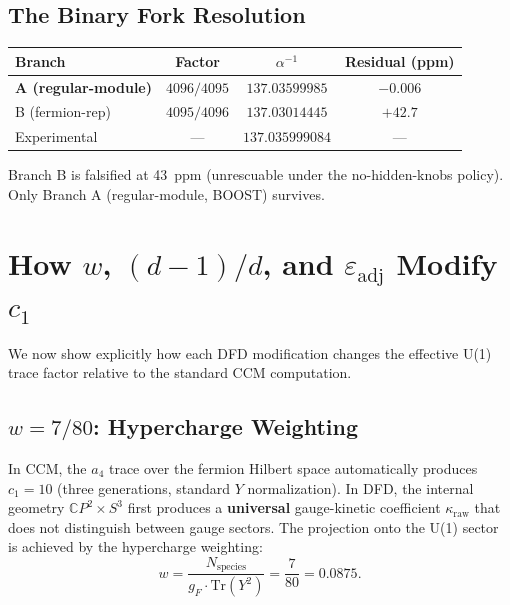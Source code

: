 \documentclass[12pt,a4paper]{article}
\begin{document}
\subsection{The Binary Fork Resolution}

\begin{center}
\renewcommand{\arraystretch}{1.3}
\begin{tabular}{lccc}
\toprule
\textbf{Branch} & \textbf{Factor} & $\alpha^{-1}$ & \textbf{Residual (ppm)} \\
\midrule
\textbf{A (regular-module)} & $4096/4095$ & $137.03599985$ & $-0.006$ \\
B (fermion-rep) & $4095/4096$ & $137.03014445$ & $+42.7$ \\
\midrule
Experimental & --- & $137.035999084$ & --- \\
\bottomrule
\end{tabular}
\end{center}

Branch B is falsified at 43~ppm (unrescuable under the no-hidden-knobs
policy).  Only Branch A (regular-module, BOOST) survives.

\section{How $w$, $(d-1)/d$, and $\varepsilon_{\mathrm{adj}}$ Modify $c_1$}
\label{sec:modifications}

We now show explicitly how each DFD modification changes the effective
U(1) trace factor relative to the standard CCM computation.

\subsection{$w = 7/80$: Hypercharge Weighting}

In CCM, the $a_4$ trace over the fermion Hilbert space automatically
produces $c_1 = 10$ (three generations, standard $Y$ normalization).
In DFD, the internal geometry $\mathbb{C}P^2 \times S^3$ first produces
a \textbf{universal} gauge-kinetic coefficient $\kappa_{\mathrm{raw}}$
that does not distinguish between gauge sectors.  The projection onto the
U(1) sector is achieved by the hypercharge weighting:
\begin{equation}
w = \frac{N_{\mathrm{species}}}{g_F \cdot \mathrm{Tr}(Y^2)}
= \frac{7}{80} = 0.0875.
\end{equation}
\end{document}
